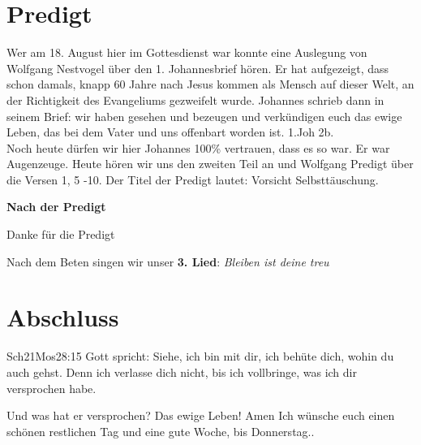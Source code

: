 \documentclass[12pt,a4paper]{scrarticle}
\begin{document}
\section{Predigt}
Wer am 18. August hier im Gottesdienst war konnte eine Auslegung von Wolfgang Nestvogel über den 1. Johannesbrief hören. Er hat aufgezeigt, dass schon damals, knapp 60 Jahre nach Jesus kommen als Mensch auf dieser Welt, an der Richtigkeit des Evangeliums gezweifelt wurde. Johannes schrieb dann in seinem Brief: wir haben gesehen und bezeugen und verkündigen euch das ewige Leben, das bei dem Vater und uns offenbart worden ist. 1.Joh 2b.\\
Noch heute dürfen wir hier Johannes 100\% vertrauen, dass es so war. Er war Augenzeuge. Heute hören wir uns den zweiten Teil an und Wolfgang Predigt über die Versen 1, 5 -10. Der Titel der Predigt lautet: Vorsicht Selbsttäuschung.

\textbf{Nach der Predigt}

Danke für die Predigt

Nach dem Beten singen wir unser \textbf{3. Lied}: \textit{Bleiben ist deine treu}\\

\section{Abschluss}

\begin{bibeltext}{Sch2}{1Mos}{28:15}
Gott spricht: Siehe, ich bin mit dir,
ich behüte dich, wohin du auch gehst.
Denn ich verlasse dich nicht,
bis ich vollbringe, was ich dir versprochen habe.
\end{bibeltext}
Und was hat er versprochen? Das ewige Leben!
Amen
Ich wünsche euch einen schönen restlichen Tag und eine gute Woche, bis Donnerstag..
\end{document}
